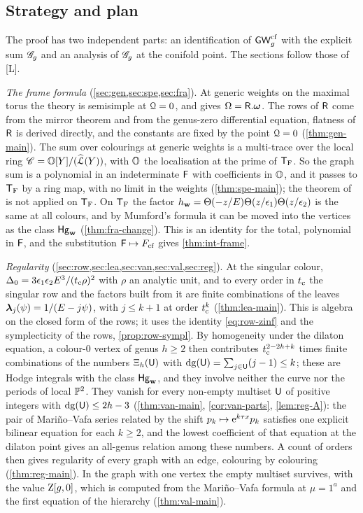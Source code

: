 \subsection{Strategy and plan}
\label{sec:int-strategy}

The proof has two independent parts: an identification of $\mathsf{GW}^{\mathrm{cf}}_g$ with the explicit sum $\mathscr{G}_g$ and an analysis of $\mathscr{G}_g$ at the conifold point. The sections follow those of \textup{[L]}.

\emph{The frame formula} (\cref{sec:gen,sec:spe,sec:fra}). At generic weights on the maximal torus the theory is semisimple at $\mathcal{Q}=0$, and \cite{Tel12} gives $\Omega=\mathsf{R}.\boldsymbol{\omega}$. The rows of $\mathsf{R}$ come from the mirror theorem and from the genus-zero differential equation, flatness of $\mathsf{R}$ is derived directly, and the constants are fixed by the point $\mathcal{Q}=0$ (\cref{thm:gen-main}). The sum over colourings at generic weights is a multi-trace over the local ring $\mathscr{C}=\mathbb{O}[Y]/(\widehat{\mathcal{L}}(Y))$, with $\mathbb{O}$ the localisation at the prime of $\mathsf{T}_{\mathrm{F}}$. So the graph sum is a polynomial in an indeterminate $\mathsf{F}$ with coefficients in $\mathbb{O}$, and it passes to $\mathsf{T}_{\mathrm{F}}$ by a ring map, with no limit in the weights (\cref{thm:spe-main}); the theorem of \cite{Tel12} is not applied on $\mathsf{T}_{\mathrm{F}}$. On $\mathsf{T}_{\mathrm{F}}$ the factor $h_{\mathbf{w}}=\Theta(-z/E)\Theta(z/\epsilon_1)\Theta(z/\epsilon_2)$ is the same at all colours, and by Mumford's formula it can be moved into the vertices as the class $\mathsf{Hg}_{\mathbf{w}}$ (\cref{thm:fra-change}). This is an identity for the total, polynomial in $\mathsf{F}$, and the substitution $\mathsf{F}\mapsto F_{\mathrm{cf}}$ gives \cref{thm:int-frame}.

\emph{Regularity} (\cref{sec:row,sec:lea,sec:van,sec:val,sec:reg}). At the singular colour, $\Delta_0=3\epsilon_1\epsilon_2E^3/(t_{\mathrm{c}}\rho)^2$ with $\rho$ an analytic unit, and to every order in $t_{\mathrm{c}}$ the singular row and the factors built from it are finite combinations of the leaves $\boldsymbol{\lambda}_j(\psi)=1/(E-j\psi)$, with $j\leq k+1$ at order $t_{\mathrm{c}}^k$ (\cref{thm:lea-main}). This is algebra on the closed form of the rows; it uses the identity \eqref{eq:row-zinf} and the symplecticity of the rows, \cref{prop:row-sympl}. By homogeneity under the dilaton equation, a colour-$0$ vertex of genus $h\geq 2$ then contributes $t_{\mathrm{c}}^{2-2h+k}$ times finite combinations of the numbers $\Xi_h(\mathsf{U})$ with $\mathrm{dg}(\mathsf{U})=\sum_{j\in\mathsf{U}}(j-1)\leq k$; these are Hodge integrals with the class $\mathsf{Hg}_{\mathbf{w}}$, and they involve neither the curve nor the periods of local $\mathbb{P}^2$. They vanish for every non-empty multiset $\mathsf{U}$ of positive integers with $\mathrm{dg}(\mathsf{U})\leq 2h-3$ (\cref{thm:van-main}, \cref{cor:van-parts}, \cref{lem:reg-A}): the pair of Mari\~no--Vafa series related by the shift $p_k\mapsto\mathrm{e}^{k\tau x}p_k$ satisfies one explicit bilinear equation for each $k\geq 2$, and the lowest coefficient of that equation at the dilaton point gives an all-genus relation among these numbers. A count of orders then gives regularity of every graph with an edge, colouring by colouring (\cref{thm:reg-main}). In the graph with one vertex the empty multiset survives, with the value $\mathrm{Z}[g,0]$, which is computed from the Mari\~no--Vafa formula at $\mu=1^a$ and the first equation of the hierarchy (\cref{thm:val-main}).


